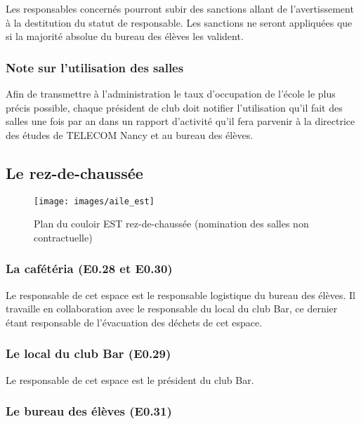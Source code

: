 \documentclass{article} %
\begin{document}
				Les responsables concernés pourront subir des sanctions allant
				de l’avertissement à la destitution du statut de responsable.
				Les sanctions ne seront appliquées que si la majorité absolue du
				bureau des élèves les valident.

			\subsubsection{Note sur l'utilisation des salles}
\label{ssub:note_sur_l_utilisation_des_salles}

				Afin de transmettre à l’administration le taux d’occupation de
				l’école le plus précis possible, chaque président de club doit
				notifier l’utilisation qu’il fait des salles une fois par an
				dans un rapport d'activité qu'il fera parvenir à la directrice
				des études de TELECOM Nancy et au bureau des élèves.

		\subsection{Le rez-de-chaussée}
\label{sub:le_rez_de_chaussee}

		\begin{figure}[]
			\centering
			\texttt{[image: images/aile\_est]}
			\caption{Plan du couloir EST rez-de-chaussée (nomination des salles
			non contractuelle)}
\label{fig:plan}
		\end{figure}

			\subsubsection{La cafétéria (E0.28 et E0.30)}
\label{ssub:la_cafeteria_e0_28_et_e0_30_}

				Le responsable de cet espace est le responsable logistique du
				bureau des élèves. Il travaille en collaboration avec le
				responsable du local du club Bar, ce dernier étant responsable
				de l’évacuation des déchets de cet espace.

			\subsubsection{Le local du club Bar (E0.29)}
\label{ssub:le_local_du_club_bar_e0_29_}

				Le responsable de cet espace est le président du club Bar.

			\subsubsection{Le bureau des élèves (E0.31)}
\label{ssub:le_bureau_des_eleves_e0_31_}
\end{document}
